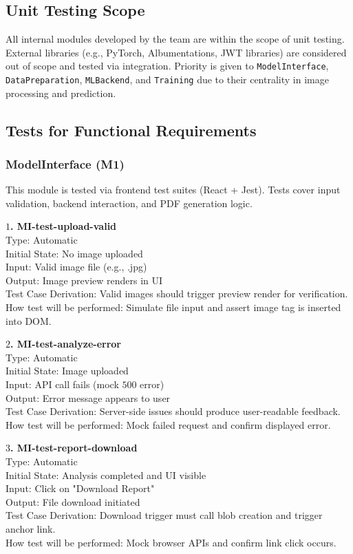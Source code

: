 \documentclass[12pt, titlepage]{article}
\begin{document}
\subsection{Unit Testing Scope}
All internal modules developed by the team are within the scope of unit testing. External libraries (e.g., PyTorch, Albumentations, JWT libraries) are considered out of scope and tested via integration. Priority is given to \texttt{ModelInterface}, \texttt{DataPreparation}, \texttt{MLBackend}, and \texttt{Training} due to their centrality in image processing and prediction.

\subsection{Tests for Functional Requirements}

\subsubsection{ModelInterface (M1)}
This module is tested via frontend test suites (React + Jest). Tests cover input validation, backend interaction, and PDF generation logic.

\textbf{$1$. MI-test-upload-valid}\\
Type: Automatic\\
Initial State: No image uploaded\\
Input: Valid image file (e.g., .jpg)\\
Output: Image preview renders in UI\\
Test Case Derivation: Valid images should trigger preview render for verification.\\
How test will be performed: Simulate file input and assert image tag is inserted into DOM.

\textbf{$2$. MI-test-analyze-error}\\
Type: Automatic\\
Initial State: Image uploaded\\
Input: API call fails (mock $500$ error)\\
Output: Error message appears to user\\
Test Case Derivation: Server-side issues should produce user-readable feedback.\\
How test will be performed: Mock failed request and confirm displayed error.

\textbf{$3$. MI-test-report-download}\\
Type: Automatic\\
Initial State: Analysis completed and UI visible\\
Input: Click on "Download Report"\\
Output: File download initiated\\
Test Case Derivation: Download trigger must call blob creation and trigger anchor link.\\
How test will be performed: Mock browser APIs and confirm link click occurs.
\end{document}
